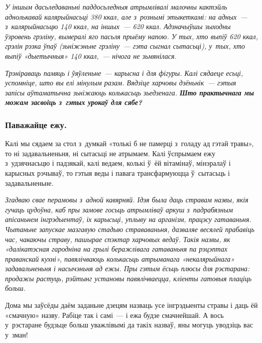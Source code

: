 
\emph{У іншым дасьледаваньні паддосьледныя атрымлівалі малочны кактэйль аднолькавай калярыйнасьці 380 ккал, але з~рознымі этыкеткамі: на адных~--- з~калярыйнасьцю 140 ккал, на іншых~--- 620 ккал. Адзначыўшы зыходны ўзровень грэліну, вымералі яго пасьля прыёму напою. У тых, хто выпіў 620 ккал, грэлін рэзка ўпаў (зьніжэньне грэліну~--- гэта сыгнал сытасьці), у~тых, хто выпіў «дыетычныя» 140 ккал,~--- нічога не зьмянілася.}

\emph{Трэніраваць памяць і ўяўленьне~--- карысна і для фігуры. Калі сядаеце есьці, успомніце, што вы елі мінулым разам. Вядзіце харчовы дзёньнік~--- гэтыя запісы аўтаматычна зьніжаюць колькасьць зьедзенага. \textbf{Што практычнага мы можам засвоіць з~гэтых урокаў для сябе?}}

\subsubsection{Паважайце ежу.}
Калі мы сядаем за стол з~думкай «толькі б не памерці з~голаду ад гэтай травы», то ні задавальненьня, ні сытасьці не атрымаем. Калі ўспрымаем ежу з~удзячнасьцю і падзякай, калі ведаем, колькі ў~ёй вітамінаў, мінэралаў і карысных рэчываў, то гэтыя веды і павага трансфармуюцца ў~сытасьць і задавальненьне. 


\emph{Згадваю свае перамовы з~адной кавярняй. Ідэя была даць стравам назвы, якія гучаць цудоўна, каб пры замове госьць атрымліваў аркуш з~падрабязным апісаньнем інгрэдыентаў, іх карысьці, уплыву на арганізм, працэсу гатаваньня. Чытаньне запускае мазгавую стадыю страваваньня, дазваляе весялей прабавіць час, чакаючы страву, пашырае спэктар харчовых ведаў. Такія назвы, як «далікатэсная гародніна на грылі беражлівага гатаваньня па рэцэптах праванскай кухні», павялічваюць колькасьць атрыманага «некалярыйнага» задавальненьня і насычэньня ад ежы. Пры гэтым ёсьць плюсы для рэстарана: продажы растуць, рэйтынг установы павялічваецца, кліенты гатовыя плаціць больш.}

Дома мы заўсёды даём заданьне дзецям назваць усе інгрэдыенты стравы і даць ёй «смачную» назву. Рабіце так і самі~--- і ежа будзе смачнейшай. А вось у~рэстаране будзьце больш уважлівымі да такіх назваў, яны могуць уводзіць вас у~зман!

